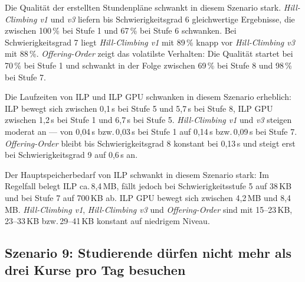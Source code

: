 Die Qualität der erstellten Stundenpläne schwankt in diesem Szenario stark.
\textit{Hill-Climbing v1} und \textit{v3} liefern bis Schwierigkeitsgrad 6 gleichwertige
Ergebnisse, die zwischen 100\,\% bei Stufe 1 und 67\,\% bei Stufe 6 schwanken. Bei
Schwierigkeitsgrad 7 liegt \textit{Hill-Climbing v1} mit 89\,\% knapp vor
\textit{Hill-Climbing v3} mit 88\,\%. \textit{Offering-Order} zeigt das volatilste Verhalten:
Die Qualität startet bei 70\,\% bei Stufe 1 und schwankt in der Folge zwischen 69\,\% bei
Stufe 8 und 98\,\% bei Stufe 7.

\vspace{1cm}

\newpage

Die Laufzeiten von ILP und ILP GPU schwanken in diesem Szenario erheblich: ILP bewegt sich
zwischen 0{,}1\,s bei Stufe 5 und 5{,}7\,s bei Stufe 8, ILP GPU zwischen 1{,}2\,s bei Stufe
1 und 6{,}7\,s bei Stufe 5. \textit{Hill-Climbing v1} und \textit{v3} steigen moderat an ---
von 0{,}04\,s bzw.\,0{,}03\,s bei Stufe 1 auf 0{,}14\,s bzw.\,0{,}09\,s bei Stufe 7.
\textit{Offering-Order} bleibt bis Schwierigkeitsgrad 8 konstant bei 0{,}13\,s und steigt
erst bei Schwierigkeitsgrad 9 auf 0{,}6\,s an.

\vspace{1cm}

\newpage

Der Hauptspeicherbedarf von ILP schwankt in diesem Szenario stark: Im Regelfall belegt ILP
ca.\,8{,}4\,MB, fällt jedoch bei Schwierigkeitsstufe 5 auf 38\,KB und bei Stufe 7 auf
700\,KB ab. ILP GPU bewegt sich zwischen 4{,}2\,MB und 8{,}4\,MB.
\textit{Hill-Climbing v1}, \textit{Hill-Climbing v3} und \textit{Offering-Order} sind mit
15--23\,KB, 23--33\,KB bzw.\,29--41\,KB konstant auf niedrigem Niveau.

\vspace{1cm}

\newpage


\subsection{Szenario 9: Studierende dürfen nicht mehr als drei Kurse pro Tag besuchen}

